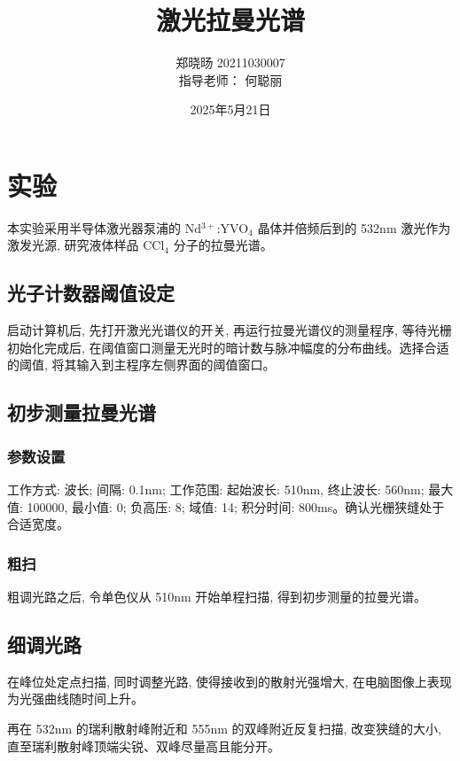 \documentclass{article}
\title{激光拉曼光谱}
\author{
    郑晓旸 20211030007\\
    指导老师：  何聪丽
}
\date{2025年5月21日}
\begin{document}
\maketitle

\tableofcontents

\newpage %

\section{实验}

本实验采用半导体激光器泵浦的 Nd$^{3+}$:YVO$_{4}$ 晶体并倍频后到的 532nm 激光作为激发光源, 研究液体样品 CCl$_{4}$ 分子的拉曼光谱。

\subsection{光子计数器阈值设定}

启动计算机后, 先打开激光光谱仪的开关, 再运行拉曼光谱仪的测量程序, 等待光栅初始化完成后, 在阈值窗口测量无光时的暗计数与脉冲幅度的分布曲线。选择合适的阈值, 将其输入到主程序左侧界面的阈值窗口。

\subsection{初步测量拉曼光谱}

\subsubsection{参数设置}

工作方式: 波长; 间隔: 0.1nm; 工作范围: 起始波长: 510nm, 终止波长: 560nm; 最大值: 100000, 最小值: 0; 负高压: 8; 域值: 14; 积分时间: 800ms。确认光栅狭缝处于合适宽度。

\subsubsection{粗扫}

粗调光路之后, 令单色仪从 510nm 开始单程扫描, 得到初步测量的拉曼光谱。

\subsection{细调光路}

在峰位处定点扫描, 同时调整光路, 使得接收到的散射光强增大, 在电脑图像上表现为光强曲线随时间上升。

再在 532nm 的瑞利散射峰附近和 555nm 的双峰附近反复扫描, 改变狭缝的大小, 直至瑞利散射峰顶端尖锐、双峰尽量高且能分开。
\end{document}
